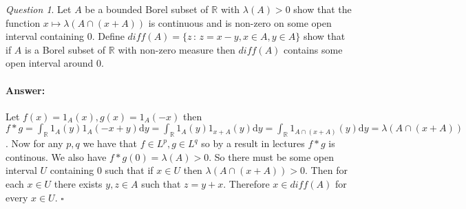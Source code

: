 \documentclass[11pt]{article}
\theoremstyle{definition}
\theoremstyle{remark}
\newtheorem{q}{Question}
\newenvironment{ans}{\paragraph{Answer:}}{\hfill$\square$\vspace{10pt}}
\begin{document}
\begin{q}
Let $A$ be a bounded Borel subset of $\mathbb{R}$ with $\lambda(A)>0$ show that the function $x \mapsto \lambda(A \cap (x+A))$ is continuous and is non-zero on some open interval containing 0. Define $diff(A) = \{ z\,:\, z=x-y, x \in A, y \in A \}$ show that if $A$ is a Borel subset of $\mathbb{R}$ with non-zero measure then $diff(A)$ contains some open interval around 0.
\end{q}
\begin{ans}
Let $f(x) = 1_{A}(x), g(x) = 1_{A}(-x)$ then $f*g = \int_\mathbb{R} 1_{A}(y) 1_{A}(-x+y) \mathrm{d}y = \int_\mathbb{R} 1_{A}(y)1_{x+A}(y) \mathrm{d}y = \int_\mathbb{R} 1_{A \cap (x+A)}(y) \mathrm{d}y = \lambda(A \cap (x+A))$. Now for any $p, q$ we have that $f \in L^p, g \in L^q$ so by a result in lectures $f*g$ is continous. We also have $f*g(0) = \lambda(A) > 0$. So there must be some open interval $U$ containing $0$ such that if $x \in U$ then $\lambda(A \cap (x+A)) >0$. Then for each $x \in U$ there exists $y, z \in A$ such that $z = y+x$. Therefore $x \in diff(A)$ for every $x \in U$.
\end{ans}
\end{document}
